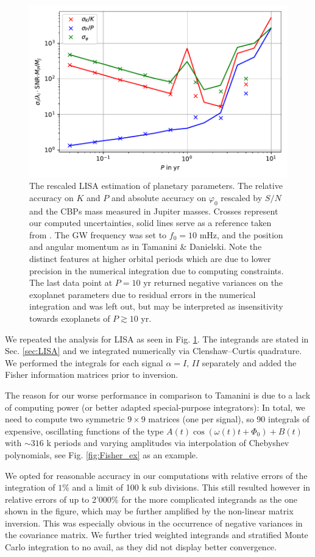 \documentclass{aa}
\begin{document}
\begin{figure}
    \centering
    \includegraphics[width=.5\textwidth]{Relative_Uncertainties_l.pdf}
\caption{The rescaled LISA estimation of planetary parameters. The relative accuracy on $K$ and $P$ and absolute accuracy on $\varphi_0$ rescaled by $S/N$ and the CBPs mass measured in Jupiter masses. Crosses represent our computed uncertainties, solid lines serve as a reference taken from \citep{tamanini}. The GW frequency was set to $f_0=10$ mHz, and the position and angular momentum as in Tamanini & Danielski. Note the distinct features at higher orbital periods which are due to lower precision in the numerical integration due to computing constraints. The last data point at $P=10$ yr returned negative variances on the exoplanet parameters due to residual errors in the numerical integration and was left out, but may be interpreted as insensitivity towards exoplanets of $P\gtrsim 10$ yr.}
    \label{fig:LISA_res}
\end{figure}

We repeated the analysis for LISA as seen in Fig. \ref{fig:LISA_res}. The integrands are stated in Sec. \ref{sec:LISA} and we integrated numerically via Clenshaw–Curtis quadrature. We performed the integrals for each signal $\alpha=I,\, II$ separately and added the Fisher information matrices prior to inversion. 

The reason for our worse performance in comparison to Tamanini is due to a lack of computing power (or better adapted special-purpose integrators): In total, we need to compute two symmetric $9\times 9$ matrices (one per signal), so 90 integrals of expensive, oscillating functions of the type $A(t)\cos(\omega(t)t+\Phi_0) + B(t)$ with $\sim 316$ k periods and varying amplitudes via interpolation of Chebyshev polynomials, see Fig. \ref{fig:Fisher_ex} as an example. 

We opted for reasonable accuracy in our computations with relative errors of the integration of $1\%$ and a limit of 100 k sub divisions. This still resulted however in relative errors of up to 2'000\% for the more complicated integrands as the one shown in the figure, which may be further amplified by the non-linear matrix inversion. This was especially obvious in the occurrence of negative variances in the covariance matrix. We further tried weighted integrands and stratified Monte Carlo integration to no avail, as they did not display better convergence.
\end{document}
